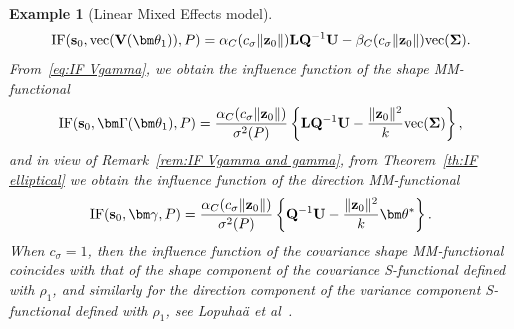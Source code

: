 \documentclass{article}
\numberwithin{equation}{section}
\theoremstyle{plain}
\newtheorem{example}{Example}
\newcommand{\vc}{\mathrm{vec}}
\newcommand{\btheta}{\bm\theta}
\newcommand{\bgamma}{\bm\gamma}
\newcommand{\bSigma}{\mathbf{\Sigma}}
\newcommand{\bGamma}{\bm\Gamma}
\newcommand{\bs}{\mathbf{s}}
\newcommand{\bz}{\mathbf{z}}
\newcommand{\bV}{\mathbf{V}}
\newcommand{\bL}{\mathbf{L}}
\newcommand{\bU}{\mathbf{U}}
\newcommand{\bQ}{\mathbf{Q}}
\begin{document}
\begin{example}[Linear Mixed Effects model]
\[
\text{\rm IF}(\bs_0,\vc(\bV(\btheta_1)),P)
=
\alpha_C(c_\sigma\|\bz_0\|)\bL\bQ^{-1}\bU
-
\beta_C(c_\sigma\|\bz_0\|)\vc(\bSigma).
\]
From~\eqref{eq:IF Vgamma}, we obtain the influence function of the shape MM-functional
\[
\text{\rm IF}(\bs_0,\bGamma(\btheta_1),P)
=
\frac{\alpha_C(c_\sigma\|\bz_0\|)}{\sigma^2(P)}
\left\{
\bL\bQ^{-1}\bU
-
\frac{\|\bz_0\|^2}{k}
\vc(\bSigma)
\right\},
\]
and in view of Remark~\ref{rem:IF Vgamma and gamma}, from Theorem~\ref{th:IF elliptical} we obtain
the influence function of the direction MM-functional
\[
\text{\rm IF}(\bs_0,\bgamma,P)
=
\frac{\alpha_C(c_\sigma\|\bz_0\|)}{\sigma^2(P)}
\left\{
\bQ^{-1}\bU
-
\frac{\|\bz_0\|^2}{k}
\btheta^*
\right\}.
\]
When $c_\sigma=1$, then the influence function of the covariance shape MM-functional 
coincides with that of the shape component of the covariance S-functional defined with $\rho_1$,
and similarly for the direction component of the variance component S-functional
defined with $\rho_1$, see Lopuha\"a \emph{et al}~\cite{lopuhaa-gares-ruizgazen2023}.
\end{example}
\end{document}
